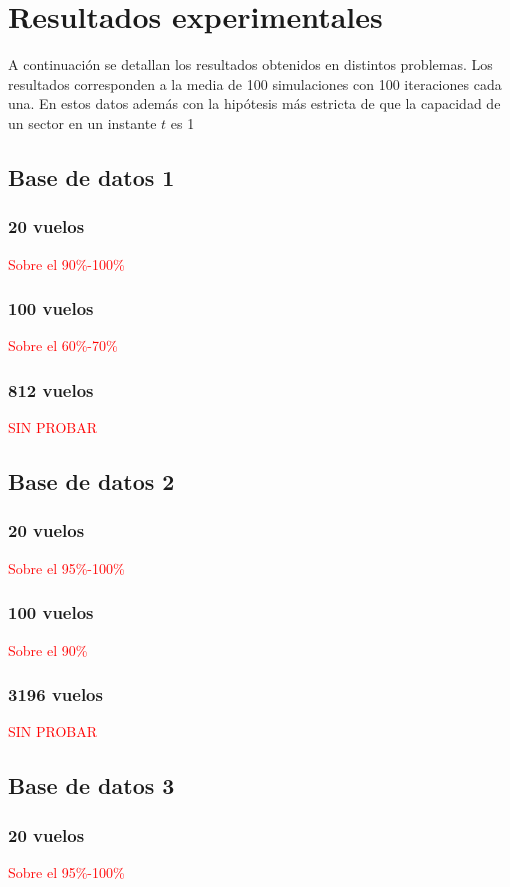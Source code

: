 \chapter{Resultados experimentales}
A continuación se detallan los resultados obtenidos en distintos problemas. Los resultados corresponden a la media de 100 simulaciones con 100 iteraciones cada una. En estos datos además con la hipótesis más estricta de que la capacidad de un sector en un instante $t$ es 1

\section{Base de datos 1}
\subsection{20 vuelos}
\textcolor{red}{Sobre el 90\%-100\%}
\subsection{100 vuelos}
\textcolor{red}{Sobre el 60\%-70\%}
\subsection{812 vuelos}
\textcolor{red}{SIN PROBAR}

\section{Base de datos 2}
\subsection{20 vuelos}
\textcolor{red}{Sobre el 95\%-100\%}
\subsection{100 vuelos}
\textcolor{red}{Sobre el 90\%}
\subsection{3196 vuelos}
\textcolor{red}{SIN PROBAR}

\section{Base de datos 3}
\subsection{20 vuelos}
\textcolor{red}{Sobre el 95\%-100\%}
